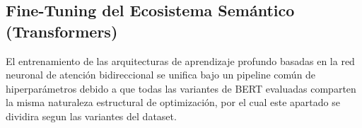 \documentclass[12pt,a4paper,onecolumn,oneside]{report}
\begin{document}
\begin{table}[htbp]
\centering
\scriptsize
\setlength{\tabcolsep}{3pt}
\renewcommand{\arraystretch}{1.3}
%
\caption{Configuración óptima de hiperparámetros para el algoritmo LightGBM.}
\label{tab:parametros_lightgbm}
\end{table}

\subsection{Fine-Tuning del Ecosistema Semántico (Transformers)}

El entrenamiento de las arquitecturas de aprendizaje profundo basadas en la red neuronal de atención bidireccional se unifica bajo un pipeline común de hiperparámetros debido a que todas las variantes de BERT evaluadas comparten la misma naturaleza estructural de optimización, por el cual este apartado se dividira segun las variantes del dataset. 
\end{document}
